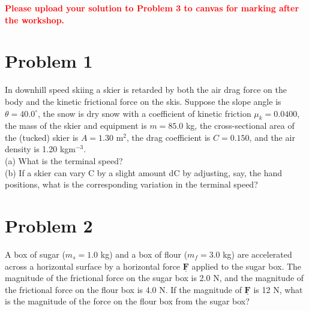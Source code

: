 \documentclass[11pt]{article}
\newcommand\vect[1]{\underline{\mathbf{#1}}}
\begin{document}
\noindent
\textbf{\textcolor{red}{Please upload your solution to Problem 3 to canvas for marking after the workshop.}}\\

\section*{Problem 1}

In downhill speed skiing a skier is retarded by both the air drag force on the body and the kinetic frictional force on the skis. Suppose the slope angle is $\theta = 40.0^{\circ}$, the snow is dry snow with a coefficient of kinetic friction $\mu_k = 0.0400$, the mass of the skier and equipment is $m = 85.0$ kg, the cross-sectional area of the (tucked) skier is $A = 1.30$ m$^2$, the drag coefficient is $C = 0.150$, and the air density is 1.20 kgm$^{-3}$. \\
(a) What is the terminal speed? \\
(b) If a skier can vary C by a slight amount dC by adjusting, say, the hand positions, what is the corresponding variation in the terminal speed?\\


\noindent

\section*{Problem 2}

A box of sugar ($m_s = 1.0$ kg) and a box of flour ($m_f = 3.0$ kg) are accelerated across a horizontal surface by a horizontal force $\vect{F}$ applied to the sugar box. The magnitude of the frictional force on the sugar box is 2.0 N, and the magnitude of the frictional force on the flour box is 4.0 N. If the magnitude of $\vect{F}$ is 12 N, what is the magnitude of the force on the flour box from the sugar box?
\end{document}
